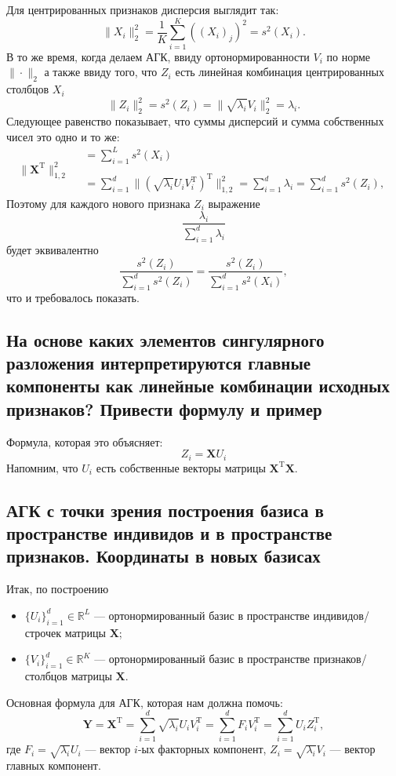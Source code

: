 \documentclass[12pt,a4paper,final]{article}
\begin{document}
Для центрированных признаков дисперсия выглядит так:
$$\|X_i\|^2_2 = \frac{1}{K} \sum_{i = 1}^K ((X_i)_j)^2 = s^2(X_i).$$ 
В то же время, когда делаем АГК, ввиду ортонормированности $V_i$ по норме $\|\cdot\|_2$ а также ввиду того, что $Z_i$ есть линейная комбинация центрированных столбцов $X_i$
$$
\|Z_i\|^2_2 =s^2(Z_i) = \|\sqrt{\lambda_i} V_i\|^2_2 = \lambda_i .
$$
Следующее равенство показывает, что суммы дисперсий и сумма собственных чисел это одно и то же:
$$
\| \bm X^\mathrm{T} \|^2_{1, 2} \quad \begin{matrix} =\boxed{\sum_{i = 1}^{L} s^2(X_i)} \qquad \qquad \qquad \qquad \qquad \qquad \qquad \qquad \\ \\  =\sum_{i = 1}^{d} \| (\sqrt{\lambda_i} U_i V_i^\mathrm{T})^\mathrm{T} \|^2_{1,2} =\boxed{\sum_{i = 1}^d \lambda_i} = \boxed{\sum_{i = 1}^ d s^2(Z_i)},  \end{matrix}
$$
Поэтому для каждого нового признака $Z_i$ выражение
$$
\frac{\lambda_i}{\sum_{i = 1}^d \lambda_i}
$$
будет эквивалентно
$$
\frac{s^2(Z_i)}{\sum_{i = 1}^d s^2(Z_i)} = \frac{s^2(Z_i)}{\sum_{i = 1}^d s^2(X_i)},
$$
что и требовалось показать.

\subsection{На основе каких элементов сингулярного разложения интерпретируются главные компоненты как линейные комбинации исходных признаков? Привести формулу и пример}

Формула, которая это объясняет:
$$
\boxed{Z_i = \bm X U_i}
$$
Напомним, что $U_i$ есть собственные векторы матрицы $\bm X^\mathrm{T} \bm X$.

\subsection{АГК с точки зрения построения базиса в пространстве индивидов и в пространстве признаков. Координаты в новых базисах}

Итак, по построению 
\begin{itemize}
\item $\{U_i\}_{i = 1}^{d} \in \mathbb{R}^L$ --- ортонормированный базис в пространстве индивидов/строчек матрицы $\bm X$;
\item $\{V_i\}_{i = 1}^{d} \in \mathbb{R}^K$ --- ортонормированный базис в пространстве признаков/столбцов матрицы $\bm X$.
\end{itemize}
Основная формула для АГК, которая нам должна помочь:
$$
\bm Y = \bm X^\mathrm{T} = \sum_{i = 1}^{d} \sqrt{\lambda_i}U_i V_i^\mathrm{T} = \sum_{i = 1}^{d} F_i V_i^\mathrm{T} = \sum_{i = 1}^{d} U_i Z_i^\mathrm{T},
$$
где $F_i = \sqrt{\lambda_i} U_i$ --- вектор $i$-ых факторных компонент, $Z_i = \sqrt{\lambda_i} V_i$ --- вектор главных компонент.
\end{document}
